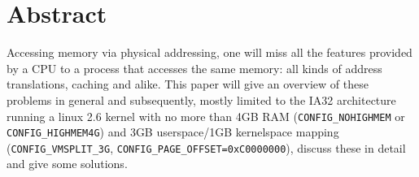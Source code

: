 %
%

\section{Abstract}

Accessing memory via physical addressing, one will miss all the features
provided by a CPU to a process that accesses the same memory: all kinds of
address translations, caching and alike. This paper will give an overview of
these problems in general and subsequently, mostly limited to the IA32
architecture running a linux 2.6 kernel with no more than 4GB RAM
(\texttt{CONFIG\_NOHIGHMEM} or \texttt{CONFIG\_HIGHMEM4G}) and 3GB userspace/1GB
kernelspace mapping (\texttt{CONFIG\_VMSPLIT\_3G},
\texttt{CONFIG\_PAGE\_OFFSET=0xC0000000}), discuss these in detail and give some
solutions.





